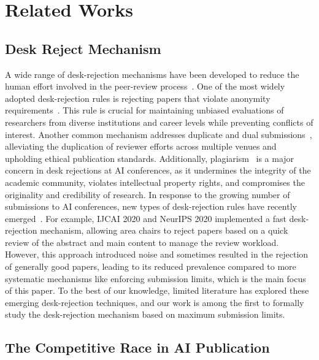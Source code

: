 \section{Related Works}
\label{sec:related_works}

\subsection{Desk Reject Mechanism}


A wide range of desk-rejection mechanisms have been developed to reduce the human effort involved in the peer-review process~\cite{as21}. One of the most widely adopted desk-rejection rules is rejecting papers that violate anonymity requirements~\cite{jawd02, t18}. This rule is crucial for maintaining unbiased evaluations of researchers from diverse institutions and career levels while preventing conflicts of interest. Another common mechanism addresses duplicate and dual submissions~\cite{s03, l13}, alleviating the duplication of reviewer efforts across multiple venues and upholding ethical publication standards. Additionally, plagiarism~\cite{kc23, er23} is a major concern in desk rejections at AI conferences, as it undermines the integrity of the academic community, violates intellectual property rights, and compromises the originality and credibility of research. In response to the growing number of submissions to AI conferences, new types of desk-rejection rules have recently emerged~\cite{lnz+24}. For example, IJCAI 2020 and NeurIPS 2020 implemented a fast desk-rejection mechanism, allowing area chairs to reject papers based on a quick review of the abstract and main content to manage the review workload. However, this approach introduced noise and sometimes resulted in the rejection of generally good papers, leading to its reduced prevalence compared to more systematic mechanisms like enforcing submission limits, which is the main focus of this paper. To the best of our knowledge, limited literature has explored these emerging desk-rejection techniques, and our work is among the first to formally study the desk-rejection mechanism based on maximum submission limits.

\subsection{The Competitive Race in AI Publication}


